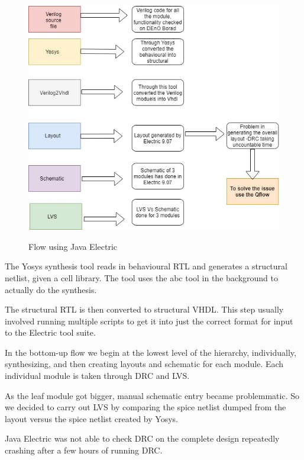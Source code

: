 \documentclass[11pt, a4paper]{article}
\begin{document}
\begin{figure}[hbt]
\includegraphics[width=\linewidth]{FLOW1.jpg}
\label{fig:flow}
\caption{Flow using Java Electric}
\end{figure}

The Yosys synthesis tool reads in behavioural RTL and generates a structural
netlist, given a cell library. The tool uses the abc tool in the background to
actually do the synthesis. 

The structural RTL is then converted to structural VHDL. This step usually
involved running multiple scripts to get it into just the correct format for
input to the Electric tool suite.

In the bottom-up flow we begin at the lowest level of the hierarchy,
individually, synthesizing, and then creating layouts and schematic for each
module. Each individual module is taken through DRC and LVS.

As the leaf module got bigger, manual schematic entry became problemmatic. So
we decided to carry out LVS by comparing the spice netlist dumped from the
layout versus the spice netlist created by Yosys. 

Java Electric was not able to check DRC on the complete design repeatedly
crashing after a few hours of running DRC. 
\end{document}

